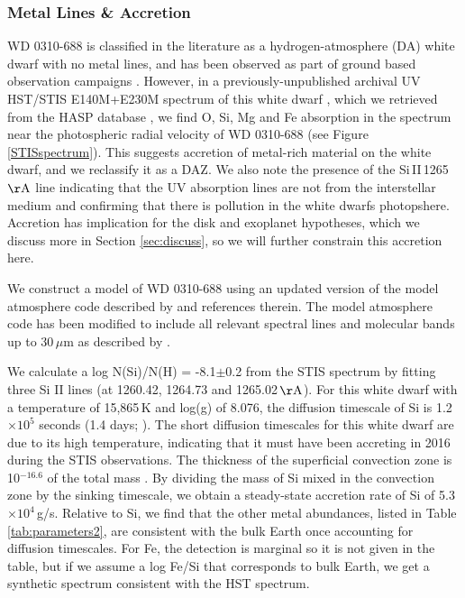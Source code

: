 \documentclass[twocolumn]{aastex631}
\begin{document}
\subsubsection{Metal Lines \& Accretion}\label{pollution}
WD 0310-688 is classified in the literature as a hydrogen-atmosphere (DA) white dwarf with no metal lines, and has been observed as part of ground based observation campaigns \citep{2009A&A...505..441K}. However, in {a previously-unpublished archival UV} HST/STIS E140M+E230M spectrum of this white dwarf \citep{2015hst..prop14076G}, which we retrieved from the HASP database \citep{2024cos..rept....1D}, we find O, Si, Mg and Fe absorption in the spectrum near the photospheric radial velocity of WD 0310-688 (see Figure \ref{STISspectrum}). This suggests accretion of metal-rich material on the white dwarf, and we reclassify it as a DAZ. We also note the presence of the Si\,II\,1265\,${\rm \AA}$ line indicating that the UV absorption lines are not from the interstellar medium \citep{2014A&A...566A..34K} and confirming that there is pollution in the white dwarfs photopshere. Accretion has implication for the disk and exoplanet hypotheses, which we discuss more in Section \ref{sec:discuss}, so we will further constrain this accretion here.

We construct a model of WD 0310-688 using an updated version of the model atmosphere code described by \cite{blouin2018a,blouin2018b} and references therein. The model atmosphere code has been modified to include all relevant spectral lines and molecular bands up to $30\,\mu$m as described by \cite{Limbach22}. 

We calculate a log N(Si)/N(H) = -8.1$\pm$0.2 from the STIS spectrum by fitting three Si II lines (at 1260.42, 1264.73 and 1265.02\,${\rm \AA}$). For this white dwarf with a temperature of 15,865\,K and log(g) of 8.076, the diffusion timescale of Si is 1.2$\times10^5$ seconds (1.4 days; \citealt{Dufour2017}). The short diffusion timescales for this white dwarf are due to its high temperature, indicating that it must have been accreting in 2016 during the STIS observations. The thickness of the superficial convection zone is 10$^{-16.6}$ of the total mass \citep{Dufour2017}. By dividing the mass of Si mixed in the convection zone by the sinking timescale, we obtain a steady-state accretion rate of Si of 5.3$\times10^4$\,g/s. 
{Relative to Si, we find that the other metal abundances, listed in Table \ref{tab:parameters2}, are consistent with the bulk Earth \citep{1995E&PSL.134..515A} once accounting for diffusion timescales. For Fe, the detection is marginal so it is not given in the table, but if we assume a log Fe/Si that corresponds to bulk Earth, we get a synthetic spectrum consistent with the HST spectrum.}
\end{document}
